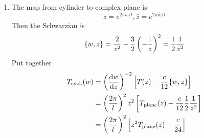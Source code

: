 \begin{enumerate}[label=(\alph*)]
	\item The map from cylinder to complex plane is
		\begin{equation*}
			z = e^{2\pi w/l}, \bar{z} = e^{2\pi \bar{w}/l}
		\end{equation*}
		Then the Schwarzian is
		\begin{align*}
			\acomm{w}{z} = \frac{2}{z^2} - \frac{3}{2} \left( -\frac{1}{z} \right)^2 = \frac{1}{2} \frac{1}{z^2}
		\end{align*}
		Put together
		\begin{align*}
			T_\text{cycl.}(w) &= \left( \dv{w}{z} \right)^{-2} \left[ T(z) - \frac{c}{12} \acomm{w}{z} \right] \\
									&= \left( \frac{2\pi}{l} \right)^2 z^2 \left[ T_{\text{plane}}(z) - \frac{c}{12} \frac{1}{2} \frac{1}{z^2} \right] \\
									&= \left( \frac{2\pi}{l} \right)^2 \left[ z^2 T_{\text{plane}}(z) - \frac{c}{24}  \right]
		\end{align*}
\end{enumerate}
